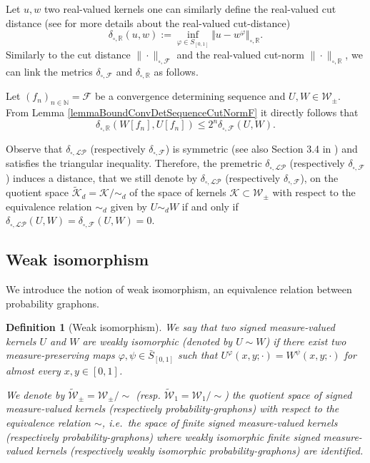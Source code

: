 \documentclass[11pt]{article}
\newtheorem{definition}[theorem]{Definition}
\def\R{\mathbb{R}}
\def\N{\mathbb{N}}
\newcommand{\cF}{{\mathcal F}}  %
\newcommand{\cK}{{\mathcal K}}  %
\newcommand{\signed}{\pm}
\newcommand{\Graphon}{\mathcal{W}_1}
\newcommand{\Kernel}{\mathcal{W}_{\signed}}
\newcommand{\UGraphon}{\widetilde{\mathcal{W}}_1}
\newcommand{\UKernel}{\widetilde{\mathcal{W}}_{\signed}}
\newcommand{\cKd}{\widetilde{\cK}_{d}}
\newcommand{\InvRelabel}{S_{[0,1]}}
\newcommand{\Relabel}{\bar{S}_{[0,1]}}
\newcommand{\NcutR}[1]{\Vert#1\Vert_{\square,\R}}
\newcommand{\simd}{\sim_{d}}
\begin{document}
Let $u,w$ two real-valued kernels one can similarly define the real-valued cut distance (see \cite{LovaszGraphLimits} for more details about the real-valued cut-distance) 
$$\delta_{\square,\R}(u,w):=\inf_{\varphi\in \InvRelabel}\NcutR{u-w^{\varphi}}.$$
Similarly to the cut distance $\|\cdot\|_{\square,\cF}$ and the real-valued cut-norm $\|\cdot\|_{\square,\R}$, we can link the metrics $\delta_{\square,\cF}$ and $\delta_{\square,\R}$ as follows. 

Let $(f_n)_{n\in \N}=\cF$ be a convergence determining sequence and $U,W\in \Kernel.$ From Lemma \ref{lemmaBoundConvDetSequenceCutNormF} it directly follows that 
$$  \delta_{\square,\R}  (W[f_n],U[f_n])\leq 2^n \delta_{\square,\cF}(U,W).$$

Observe that  $\delta_{\square,\mathcal{LP}}$ (respectively $\delta_{\square,\cF}$) is symmetric (see also Section 3.4 in \cite{abraham2023probabilitygraphons}) and satisfies the triangular inequality. Therefore, the premetric $\delta_{\square,\mathcal{LP}}$ (respectively $\delta_{\square,\cF}$) induces a distance, that we  still denote  by $\delta_{\square,\mathcal{LP}}$ (respectively $\delta_{\square,\cF}$), on  the quotient space $\cKd = \cK / \simd$ of  the space of kernels $\cK\subset \Kernel$  with respect to the equivalence relation $\simd$ given by $U\simd W$  if and only if  $\delta_{\square,\mathcal{LP}}(U,W)=\delta_{\square,\cF}(U,W)=0$.


\subsection{Weak isomorphism}
\label{section_weak_isomorphism}
We introduce the notion of weak isomorphism, an equivalence relation between probability graphons. 

\begin{definition}[Weak isomorphism]\label{def_weak_isomorphism}
We say that two signed measure-valued kernels $U$ and $W$ are \emph{weakly isomorphic}
(denoted by $U\sim W$) if there exist two measure-preserving maps $\varphi, \psi\in\Relabel$
such that $U^\varphi(x,y; \cdot) = W^\psi(x,y;\cdot)$ for almost every $x,y\in [0,1]$.

We denote by $\UKernel=\Kernel / \sim$ (resp. $\UGraphon=\Graphon / \sim$) the quotient space of signed measure-valued kernels (respectively probability-graphons) with respect to the equivalence relation $\sim$, i.e.\ the space of finite signed measure-valued kernels (respectively probability-graphons) where weakly isomorphic finite signed measure-valued kernels (respectively weakly isomorphic probability-graphons) are identified. 
\end{definition}
\end{document}
